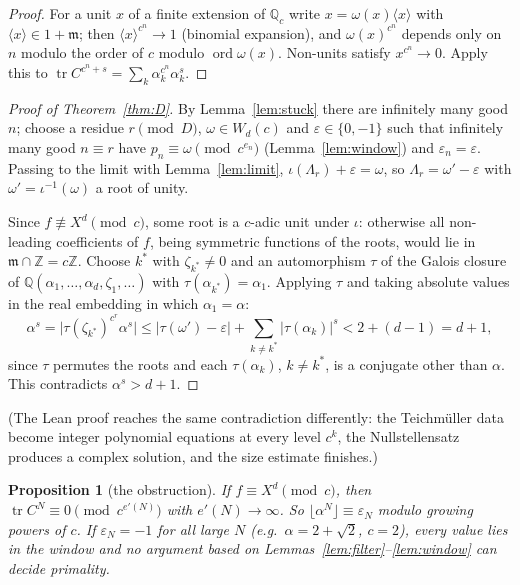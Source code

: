 \documentclass[11pt]{amsart}
\newtheorem{proposition}[theorem]{Proposition}
\theoremstyle{definition}
\newcommand{\Z}{\mathbb{Z}}
\newcommand{\Q}{\mathbb{Q}}
\newcommand{\tr}{\operatorname{tr}}
\newcommand{\ord}{\operatorname{ord}}
\newcommand{\floor}[1]{\lfloor #1 \rfloor}
\begin{document}
\begin{proof}
For a unit $x$ of a finite extension of $\Q_c$ write $x=\omega(x)\langle x\rangle$ with $\langle x\rangle\in1+\mathfrak m$; then $\langle x\rangle^{c^n}\to1$ (binomial expansion), and $\omega(x)^{c^n}$ depends only on $n$ modulo the order of $c$ modulo $\ord\omega(x)$.  Non-units satisfy $x^{c^n}\to0$.  Apply this to $\tr C^{c^n+s}=\sum_k\alpha_k^{c^n}\alpha_k^s$.
\end{proof}

\begin{proof}[Proof of Theorem~\ref{thm:D}]
By Lemma~\ref{lem:stuck} there are infinitely many good $n$; choose a residue $r\pmod D$, $\omega\in W_d(c)$ and $\varepsilon\in\{0,-1\}$ such that infinitely many good $n\equiv r$ have $p_n\equiv\omega\pmod{c^{e_n}}$ (Lemma~\ref{lem:window}) and $\varepsilon_n=\varepsilon$.  Passing to the limit with Lemma~\ref{lem:limit}, $\iota(\Lambda_r)+\varepsilon=\omega$, so $\Lambda_r=\omega'-\varepsilon$ with $\omega'=\iota^{-1}(\omega)$ a root of unity.

Since $f\not\equiv X^d\pmod c$, some root is a $c$-adic unit under $\iota$: otherwise all non-leading coefficients of $f$, being symmetric functions of the roots, would lie in $\mathfrak m\cap\Z=c\Z$.  Choose $k^*$ with $\zeta_{k^*}\neq0$ and an automorphism $\tau$ of the Galois closure of $\Q(\alpha_1,\dots,\alpha_d,\zeta_1,\dots)$ with $\tau(\alpha_{k^*})=\alpha_1$.  Applying $\tau$ and taking absolute values in the real embedding in which $\alpha_1=\alpha$:
\[ \alpha^s=\big|\tau(\zeta_{k^*})^{c^r}\alpha^s\big|\le|\tau(\omega')-\varepsilon|+\sum_{k\neq k^*}|\tau(\alpha_k)|^s<2+(d-1)=d+1, \]
since $\tau$ permutes the roots and each $\tau(\alpha_k)$, $k\neq k^*$, is a conjugate other than $\alpha$.  This contradicts $\alpha^s>d+1$.
\end{proof}

(The Lean proof reaches the same contradiction differently: the Teichm\"uller data become integer polynomial equations at every level $c^k$, the Nullstellensatz produces a complex solution, and the size estimate finishes.)

\begin{proposition}[the obstruction]\label{prop:Dobstruction}
If $f\equiv X^d\pmod c$, then $\tr C^N\equiv0\pmod{c^{e'(N)}}$ with $e'(N)\to\infty$.  So $\floor{\alpha^N}\equiv\varepsilon_N$ modulo growing powers of $c$.  If $\varepsilon_N=-1$ for all large $N$ (e.g.\ $\alpha=2+\sqrt2$, $c=2$), every value lies in the window and no argument based on Lemmas~\ref{lem:filter}--\ref{lem:window} can decide primality.
\end{proposition}
\end{document}
